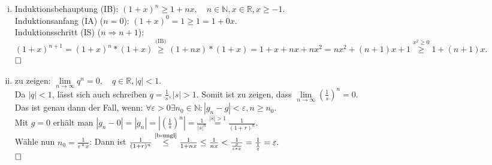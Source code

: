 \documentclass[12pt,a4paper]{article}
\newcommand{\qed}{\null\nobreak\hfill\square}
\begin{document}
\begin{enumerate}[(i)]
    \item \label{b-ungl}Induktionsbehauptung (IB): $(1 + x)^n \geq 1 + nx,\quad n \in \mathbb{N}, x \in \mathbb{R}, x \geq -1.$\\
    Induktionsanfang (IA) ($n=0$): $(1 + x)^0 = 1 \geq 1 = 1 + 0x.$\\
    Induktionsschritt (IS) ($n \Rightarrow n+1$): $(1+x)^{n+1} = (1+x)^n * (1+x) \overset{\text{(IB)}}{\geq} (1+nx) * (1+x) = 1 + x + nx + nx^2 = nx^2 + (n+1)x + 1 \overset{x^2 \geq 0}{\geq} 1 + (n+1)x.$\\
    $\qed$

    \item zu zeigen: $\lim\limits_{n \to \infty} q^n = 0,\quad q \in \mathbb{R}, |q| < 1.$\\
    Da $|q| < 1$, lässt sich auch schreiben $q = \frac{1}{s}, |s| > 1.$
    Somit ist zu zeigen, dass $\lim\limits_{n \to \infty} (\frac{1}{s})^n = 0.$\\
    Das ist genau dann der Fall, wenn:
    $\forall \varepsilon > 0 \exists n_0 \in \mathbb{N} : |g_n - g| < \varepsilon, n \geq n_0.$\\
    Mit $g = 0$ erhält man $|g_n - 0| = |g_n| = |(\frac{1}{s})^n| = \frac{1}{|s|^n} \overset{|s| > 1}{=} \frac{1}{(1 + r)^n}.$\\
    Wähle nun $n_0 = \frac{1}{\varepsilon * x}$:
    Dann ist $\frac{1}{(1 + r)^n} \overset{\text{\ref{b-ungl}}}{\leq} \frac{1}{1 + nx} \leq \frac{1}{nx} < \frac{1}{\frac{x}{\varepsilon * x}} = \frac{1}{\frac{1}{\varepsilon}} = \varepsilon.$\\
    $\qed$


\end{enumerate}
\end{document}
